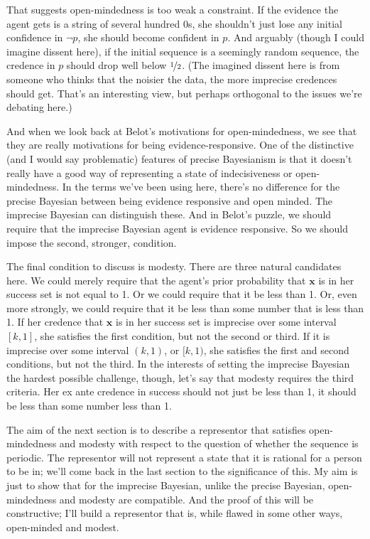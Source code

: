 \documentclass{ergoclass}
\newcommand{\vx}{\boldsymbol{x}}
\begin{document}
That suggests open-mindedness is too weak a constraint. If the evidence the agent gets is a string of several hundred 0s, she shouldn't just lose any initial confidence in $\neg p$, she should become confident in $p$. And arguably (though I could imagine dissent here), if the initial sequence is a seemingly random sequence, the credence in $p$ should drop well below $\nicefrac{1}{2}$. (The imagined dissent here is from someone who thinks that the noisier the data, the more imprecise credences should get. That's an interesting view, but perhaps orthogonal to the issues we're debating here.)

And when we look back at Belot's motivations for open-mindedness, we see that they are really motivations for being evidence-responsive. One of the distinctive (and I would say problematic) features of precise Bayesianism is that it doesn't really have a good way of representing a state of indecisiveness or open-mindedness. In the terms we've been using here, there's no difference for the precise Bayesian between being evidence responsive and open minded. The imprecise Bayesian can distinguish these. And in Belot's puzzle, we should require that the imprecise Bayesian agent is evidence responsive. So we should impose the second, stronger, condition.

The final condition to discuss is modesty. \label{ModestDef}There are three natural candidates here. We could merely require that the agent's prior probability that $\vx$ is in her success set is not equal to 1. Or we could require that it be less than 1. Or, even more strongly, we could require that it be less than some number that is less than 1. If her credence that $\vx$ is in her success set is imprecise over some interval $[k, 1]$, she satisfies the first condition, but not the second or third. If it is imprecise over some interval $(k, 1)$, or $[k, 1)$, she satisfies the first and second conditions, but not the third. In the interests of setting the imprecise Bayesian the hardest possible challenge, though, let's say that modesty requires the third criteria. Her ex ante credence in success should not just be less than 1, it should be less than some number less than 1. 

The aim of the next section is to describe a representor that satisfies open-mindedness and modesty with respect to the question of whether the sequence is periodic. The representor will not represent a state that it is rational for a person to be in; we'll come back in the last section to the significance of this. My aim is just to show that for the imprecise Bayesian, unlike the precise Bayesian, open-mindedness and modesty are compatible. And the proof of this will be constructive; I'll build a representor that is, while flawed in some other ways, open-minded and modest.
\end{document}
